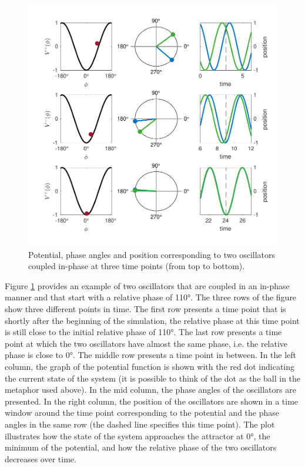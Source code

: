 \begin{figure}[b]
	\includegraphics[width=\textwidth]{figures/ch3/coupled_oscillators.pdf}
	\caption[Potential, phase angles and position corresponding to two oscillators coupled in-phase]{Potential, phase angles and position corresponding to two oscillators coupled in-phase at three time points (from top to bottom).}
	\label{fig:coupled_oscillators}
\end{figure}

Figure \ref{fig:coupled_oscillators} provides an example of two oscillators that are coupled in an in-phase manner and that start with a relative phase of 110°. The three rows of the figure show three different points in time. The first row presents a time point that is shortly after the beginning of the simulation, the relative phase at this time point is still close to the initial relative phase of 110°. The last row presents a time point at which the two oscillators have almost the same phase, i.e. the relative phase is close to 0°. The middle row presents a time point in between. In the left column, the graph of the potential function is shown with the red dot indicating the current state of the system (it is possible to think of the dot as the ball in the metaphor used above). In the mid column, the phase angles of the oscillators are presented. In the right column, the position of the oscillators are shown in a time window around the time point corresponding to the potential and the phase angles in the same row (the dashed line specifies this time point). The plot illustrates how the state of the system approaches the attractor at 0°, the minimum of the potential, and how the relative phase of the two oscillators decreases over time. 



